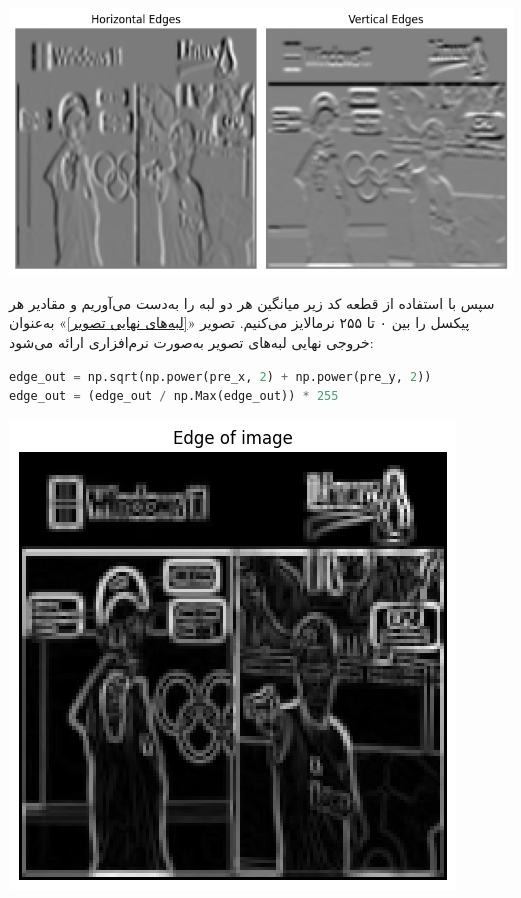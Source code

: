 \begin{qsolve}
	\begin{center}
		\includegraphics*[width=1\linewidth]{pics/img21.png}
		\label{لبه‌های افقی و عمودی پیدا شده}
	\end{center}
	
	سپس با استفاده از قطعه کد زیر میانگین هر دو لبه را به‌دست می‌آوریم و مقادیر هر پیکسل را بین ۰ تا ۲۵۵ نرمالایز می‌کنیم. تصویر «\ref{لبه‌های نهایی تصویر}» به‌عنوان خروجی نهایی لبه‌های تصویر به‌صورت نرم‌افزاری ارائه می‌شود:
\end{qsolve}


\begin{latin}
\begin{lstlisting}[language=Python,caption={SW Edge Detector}]
edge_out = np.sqrt(np.power(pre_x, 2) + np.power(pre_y, 2))
edge_out = (edge_out / np.Max(edge_out)) * 255
\end{lstlisting}
\end{latin}



\begin{qsolve}
	\begin{center}
		\includegraphics*[width=0.45\linewidth]{pics/img22.png}
		\label{لبه‌های نهایی تصویر}
	\end{center}
\end{qsolve}




